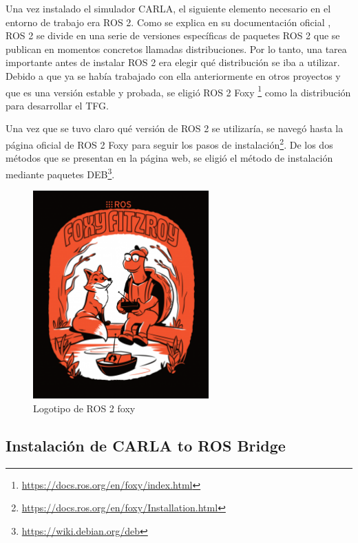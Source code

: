 Una vez instalado el simulador CARLA, el siguiente elemento necesario en el entorno de trabajo era ROS 2. Como se explica en su documentación oficial \cite{distribuciones_ros}, ROS 2 se divide en una serie de versiones específicas de paquetes ROS 2 que se publican en momentos concretos llamadas distribuciones. Por lo tanto, una tarea importante antes de instalar ROS 2 era elegir qué distribución se iba a utilizar. Debido a que ya se había trabajado con ella anteriormente en otros proyectos y que es una versión estable y probada, se eligió ROS 2 Foxy \footnote{\url{https://docs.ros.org/en/foxy/index.html}} como la distribución para desarrollar el \ac{TFG}.

\bigskip

Una vez que se tuvo claro qué versión de ROS 2 se utilizaría, se navegó hasta la página oficial de ROS 2 Foxy para seguir los pasos de instalación\footnote{\url{https://docs.ros.org/en/foxy/Installation.html}}. De los dos métodos que se presentan en la página web, se eligió el método de instalación mediante paquetes DEB\footnote{\url{https://wiki.debian.org/deb}}.

\begin{figure} [H]
	\begin{center}
	\includegraphics[height=8cm]{imagenes/cap4/ros_2_foxy.png}
	\end{center}
	\caption[Logotipoo de ROS 2 foxy]{Logotipo de ROS 2 foxy}
	\label{fig:logotipo_ros_2_foxy}
\end{figure}


\subsection{Instalación de CARLA to ROS Bridge}
\label{carla-to-ros-bridge}

